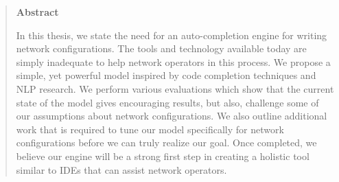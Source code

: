 \begin{quote}
\begin{center}{\bf \large Abstract}\end{center}
In this thesis, we state the need for an auto-completion engine for writing network configurations. The tools and technology available today are simply inadequate to help network operators in this process. We propose a simple, yet powerful model inspired by code completion techniques and NLP research. We perform various evaluations which show that the current state of the model gives encouraging results, but also, challenge some of our assumptions about network configurations. We also outline additional work that is required to tune our model specifically for network configurations before we can truly realize our goal. Once completed, we believe our engine will be a strong first step in creating a holistic tool similar to IDEs that can assist network operators. 
\end{quote}
